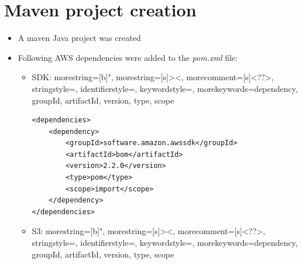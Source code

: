 \section{Maven project creation}
\begin{itemize}
  \item A maven Java project was created
  \item Following AWS dependencies were added to the \textit{pom.xml} file:
        \begin{itemize}
          \item SDK:
                {
                  morestring=[b]",
                  morestring=[s]{>}{<},
                  morecomment=[s]{<?}{?>},
                  stringstyle=\color{blue},
                  identifierstyle=\color{magenta},
                  keywordstyle=\color{cyan},
                  morekeywords={dependency, groupId, artifactId, version, type, scope}
                }



                \begin{lstlisting}
<dependencies>
    <dependency>
        <groupId>software.amazon.awssdk</groupId>
        <artifactId>bom</artifactId>
        <version>2.2.0</version>
        <type>pom</type>
        <scope>import</scope>
    </dependency>
</dependencies>
\end{lstlisting}

        \end{itemize}
        \begin{itemize}
          \item S3:
                {
                  morestring=[b]",
                  morestring=[s]{>}{<},
                  morecomment=[s]{<?}{?>},
                  stringstyle=\color{blue},
                  identifierstyle=\color{magenta},
                  keywordstyle=\color{cyan},
                  morekeywords={dependency, groupId, artifactId, version, type, scope}
                }


\end{itemize}
\end{itemize}
